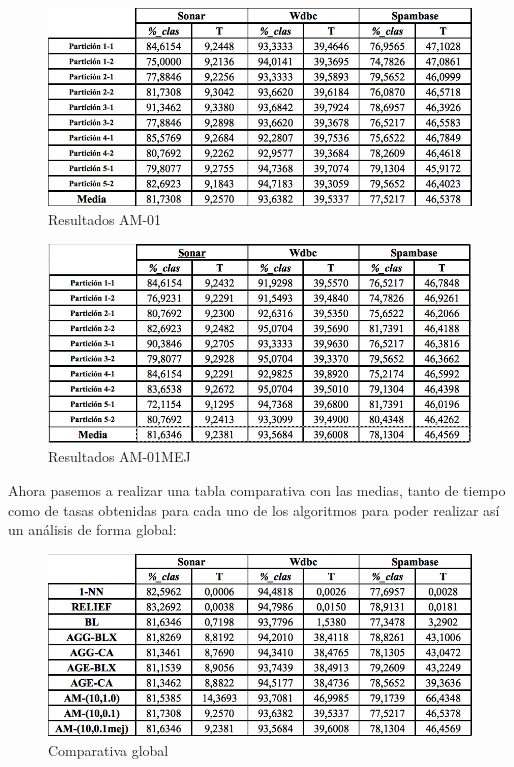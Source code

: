\begin{figure}[H]
	\centering
	\caption{Resultados AM-01} \label{fig: Resultados AM-01}
	\includegraphics[scale=0.55]{AM-01.png}  
	
\end{figure}

\begin{figure}[H]
	\centering
	\caption{Resultados AM-01MEJ} \label{fig: Resultados AM-01MEJ}
	\includegraphics[scale=0.55]{AM-01MEJ.png}  
	
\end{figure}


Ahora pasemos a realizar una tabla comparativa con las medias, tanto de tiempo como de tasas obtenidas para cada uno de los algoritmos para poder realizar así un análisis de forma global:

\begin{figure}[H]
	\centering
	\caption{Comparativa global} \label{fig: Comparativa Global}
	\includegraphics[scale=0.55]{GLOBAL.png}  
	
\end{figure}

